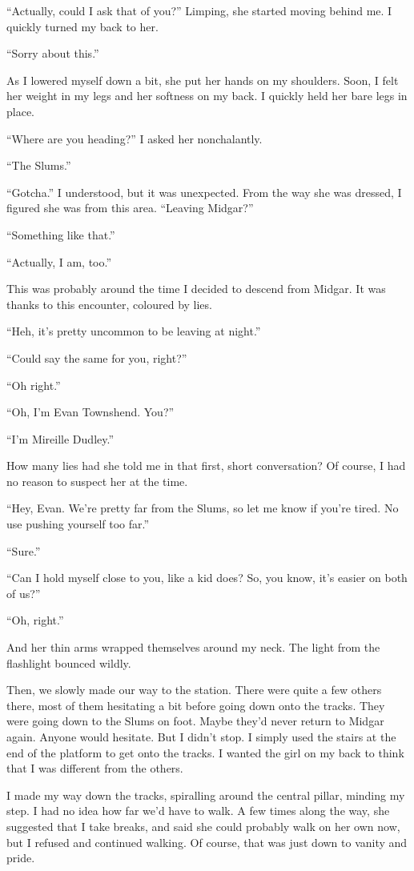 \documentclass[oneside]{book}
\begin{document}
“Actually, could I ask that of you?” Limping, she started moving behind me. I quickly turned my back to her.

“Sorry about this.”

As I lowered myself down a bit, she put her hands on my shoulders. Soon, I felt her weight in my legs and her softness on my back. I quickly held her bare legs in place.

“Where are you heading?” I asked her nonchalantly.

“The Slums.”

“Gotcha.” I understood, but it was unexpected. From the way she was dressed, I figured she was from this area. “Leaving Midgar?”

“Something like that.”

“Actually, I am, too.”

This was probably around the time I decided to descend from Midgar. It was thanks to this encounter, coloured by lies.

“Heh, it’s pretty uncommon to be leaving at night.”

“Could say the same for you, right?”

“Oh right.”

“Oh, I’m Evan Townshend. You?”

“I’m Mireille Dudley.”

How many lies had she told me in that first, short conversation? Of course, I had no reason to suspect her at the time.

“Hey, Evan. We’re pretty far from the Slums, so let me know if you’re tired. No use pushing yourself too far.”

“Sure.”

“Can I hold myself close to you, like a kid does? So, you know, it’s easier on both of us?”

“Oh, right.”

And her thin arms wrapped themselves around my neck. The light from the flashlight bounced wildly.

Then, we slowly made our way to the station. There were quite a few others there, most of them hesitating a bit before going down onto the tracks. They were going down to the Slums on foot. Maybe they’d never return to Midgar again. Anyone would hesitate. But I didn’t stop. I simply used the stairs at the end of the platform to get onto the tracks. I wanted the girl on my back to think that I was different from the others.

I made my way down the tracks, spiralling around the central pillar, minding my step. I had no idea how far we’d have to walk. A few times along the way, she suggested that I take breaks, and said she could probably walk on her own now, but I refused and continued walking. Of course, that was just down to vanity and pride.
\end{document}
